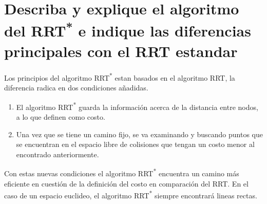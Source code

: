 \section{Describa y explique el algoritmo del RRT\textsuperscript{*} e indique las diferencias principales con el RRT estandar}
Los principios del algoritmo RRT\textsuperscript{*} estan basados en el algoritmo RRT, la diferencia radica en dos condiciones añadidas.
\begin{enumerate}
    \item El algoritmo RRT\textsuperscript{*} guarda la información acerca de la distancia entre nodos, a lo que definen como costo.
    \item Una vez que se tiene un camino fijo, se va examinando y buscando puntos que se encuentran en el espacio libre de colisiones que tengan un costo menor al encontrado anteriormente.
\end{enumerate}
Con estas nuevas condiciones el algoritmo RRT\textsuperscript{*} encuentra un camino más eficiente en cuestión de la definición del costo en comparación del RRT. En el caso de un espacio euclideo, el algoritmo RRT\textsuperscript{*} siempre encontrará lineas rectas.